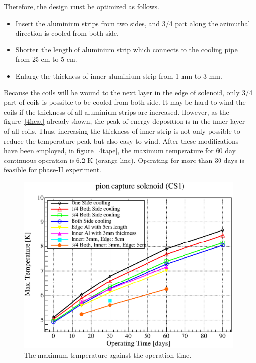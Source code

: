 Therefore, the design must be optimized as follows.
\begin{itemize}
 \setlength{\itemsep}{-5pt}
 \item Insert the aluminium strips from two sides, and 3/4 part along the azimuthal direction is cooled from both side.
 \item Shorten the length of aluminium strip which connects to the cooling pipe from 25 cm to 5 cm.
 \item Enlarge the thickness of inner aluminium strip from 1 mm to 3 mm. 
\end{itemize}
Because the coils will be wound to the next layer in the edge of solenoid, only 3/4 part of coils is possible to be cooled from both side.
It may be hard to wind the coils if the thickness of all aluminium strips are increased.
However, as the figure~\ref{4heat} already shown, the peak of energy deposition is in the inner layer of all coils.
Thus, increasing the thickness of inner strip is not only possible to reduce the temperature peak but also easy to wind.
After these modifications have been employed, in figure~\ref{4tape}, the maximum temperature for 60 day continuous operation is 6.2 K (orange line).
Operating for more than 30 days is feasible for phase-II experiment.
  \begin{figure}[H]
   \centering
   \includegraphics[scale=0.45]{chapter5/fig/maxtemp.eps}
   \caption{ The maximum temperature against the operation time.}
   \label{4maxtemp}
  \end{figure}

